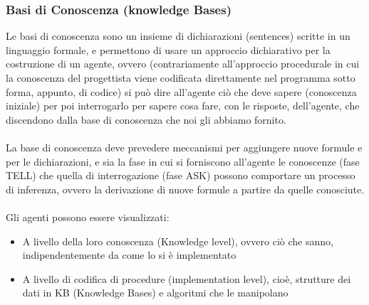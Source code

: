 \documentclass[../main.tex]{subfiles}
\begin{document}
	\subsubsection{Basi di Conoscenza (knowledge Bases)}
	Le basi di conoscenza sono un insieme di dichiarazioni (sentences) scritte in un linguaggio formale, e permettono di usare un approccio dichiarativo per la costruzione di un agente, ovvero (contrariamente all'approccio procedurale in cui la conoscenza del progettista viene codificata direttamente nel programma sotto forma, appunto, di codice) si può dire all'agente ciò che deve sapere (conoscenza iniziale) per poi interrogarlo per sapere cosa fare, con le risposte, dell'agente, che discendono dalla base di conoscenza che noi gli abbiamo fornito.\\\\
	La base di conoscenza deve prevedere meccanismi per aggiungere nuove formule e per le dichiarazioni, e sia la fase in cui si forniscono all'agente le conoscenze (fase TELL) che quella di interrogazione (fase ASK) possono comportare un processo di inferenza, ovvero la derivazione di nuove formule a partire da quelle conosciute.\\\\
	Gli agenti possono essere visualizzati:
	\begin{itemize}
		\item A livello della loro conoscenza (Knowledge level), ovvero ciò che sanno, indipendentemente da come lo si è implementato
		\item A livello di codifica di procedure (implementation level), cioè, strutture dei dati in KB (Knowledge Bases) e algoritmi che le manipolano
	\end{itemize}
\end{document}
